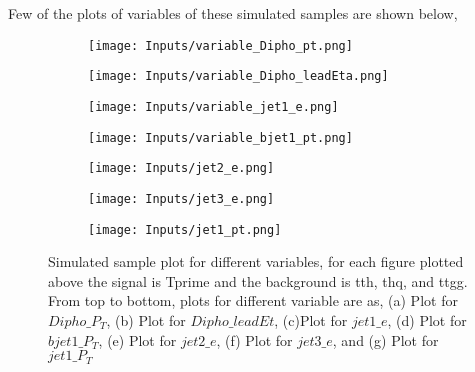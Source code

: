 Few of the plots of variables of these simulated samples are shown below,
\begin{figure}[H]
\begin{subfigure}{.5\textwidth}
  \centering
  \texttt{[image: Inputs/variable\_Dipho\_pt.png]}  
  \caption{}
  \label{fig:sub-first}
\end{subfigure}
\begin{subfigure}{.5\textwidth}
  \centering
  \texttt{[image: Inputs/variable\_Dipho\_leadEta.png]}  
  \caption{}
  \label{fig:sub-second}
\end{subfigure}



\begin{subfigure}{.5\textwidth}
  \centering
  \texttt{[image: Inputs/variable\_jet1\_e.png]}  
  \caption{}
  \label{fig:sub-third}
\end{subfigure}
\begin{subfigure}{.5\textwidth}
  \centering
  \texttt{[image: Inputs/variable\_bjet1\_pt.png]}  
  \caption{}
  \label{fig:sub-fourth}
\end{subfigure}


\begin{subfigure}{.5\textwidth}
  \centering
  \texttt{[image: Inputs/jet2\_e.png]}  
  \caption{}
  \label{fig:sub-fifth}
\end{subfigure}
\begin{subfigure}{.5\textwidth}
  \centering
  \texttt{[image: Inputs/jet3\_e.png]}  
  \caption{}
  \label{fig:sub-fourth}
\end{subfigure}

\begin{subfigure}{.5\textwidth}
  \centering
  \texttt{[image: Inputs/jet1\_pt.png]}  
  \caption{}
  \label{fig:sub-third}
\end{subfigure}
\caption{Simulated sample plot for different variables, for each figure plotted above the signal is Tprime and the background is tth, thq, and ttgg. From top to bottom, plots for different variable are as, (a) Plot for $Dipho\_P_T$, (b) Plot for $Dipho\_leadEt$, (c)Plot for $jet1\_e$, (d) Plot for $bjet1\_P_T$, (e) Plot for $jet2\_e$, (f) Plot for $jet3\_e$, and (g) Plot for $jet1\_P_T$ }
\label{fig:fig}
\end{figure}
 
